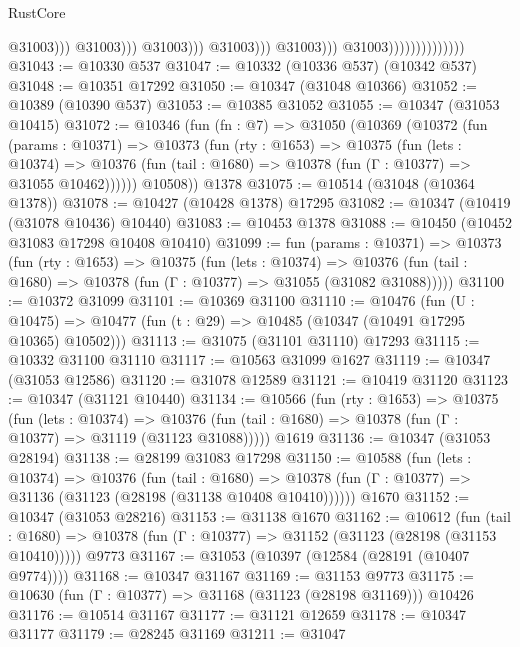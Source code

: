 \begin{lexlean}{RustCore}
\begin{coremodule}
                                                              @31003)))
                                                        @31003)))
                                                  @31003)))
                                            @31003)))
                                      @31003)))
                                @31003))))))))))))))
@31043 := @10330 @537
@31047 := @10332 (@10336 @537) (@10342 @537)
@31048 := @10351 @17292
@31050 := @10347 (@31048 @10366)
@31052 := @10389 (@10390 @537)
@31053 := @10385 @31052
@31055 := @10347 (@31053 @10415)
@31072 := @10346
    (fun (fn : @7) =>
    @31050
      (@10369
        (@10372
          (fun (params : @10371) =>
          @10373
            (fun (rty : @1653) =>
            @10375
              (fun (lets : @10374) =>
              @10376 (fun (tail : @1680) => @10378 (fun (Γ : @10377) => @31055 @10462))))))
        @10508))
    @1378
@31075 := @10514 (@31048 (@10364 @1378))
@31078 := @10427 (@10428 @1378) @17295
@31082 := @10347 (@10419 (@31078 @10436) @10440)
@31083 := @10453 @1378
@31088 := @10450 (@10452 @31083 @17298 @10408 @10410)
@31099 := fun (params : @10371) =>
  @10373
    (fun (rty : @1653) =>
    @10375
      (fun (lets : @10374) =>
      @10376 (fun (tail : @1680) => @10378 (fun (Γ : @10377) => @31055 (@31082 @31088)))))
@31100 := @10372 @31099
@31101 := @10369 @31100
@31110 := @10476
    (fun (U : @10475) => @10477 (fun (t : @29) => @10485 (@10347 (@10491 @17295 @10365) @10502)))
@31113 := @31075 (@31101 @31110) @17293
@31115 := @10332 @31100 @31110
@31117 := @10563 @31099 @1627
@31119 := @10347 (@31053 @12586)
@31120 := @31078 @12589
@31121 := @10419 @31120
@31123 := @10347 (@31121 @10440)
@31134 := @10566
    (fun (rty : @1653) =>
    @10375
      (fun (lets : @10374) =>
      @10376 (fun (tail : @1680) => @10378 (fun (Γ : @10377) => @31119 (@31123 @31088)))))
    @1619
@31136 := @10347 (@31053 @28194)
@31138 := @28199 @31083 @17298
@31150 := @10588
    (fun (lets : @10374) =>
    @10376
      (fun (tail : @1680) =>
      @10378 (fun (Γ : @10377) => @31136 (@31123 (@28198 (@31138 @10408 @10410))))))
    @1670
@31152 := @10347 (@31053 @28216)
@31153 := @31138 @1670
@31162 := @10612
    (fun (tail : @1680) => @10378 (fun (Γ : @10377) => @31152 (@31123 (@28198 (@31153 @10410)))))
    @9773
@31167 := @31053 (@10397 (@12584 (@28191 (@10407 @9774))))
@31168 := @10347 @31167
@31169 := @31153 @9773
@31175 := @10630 (fun (Γ : @10377) => @31168 (@31123 (@28198 @31169))) @10426
@31176 := @10514 @31167
@31177 := @31121 @12659
@31178 := @10347 @31177
@31179 := @28245 @31169
@31211 := @31047

\end{coremodule}
\end{lexlean}
